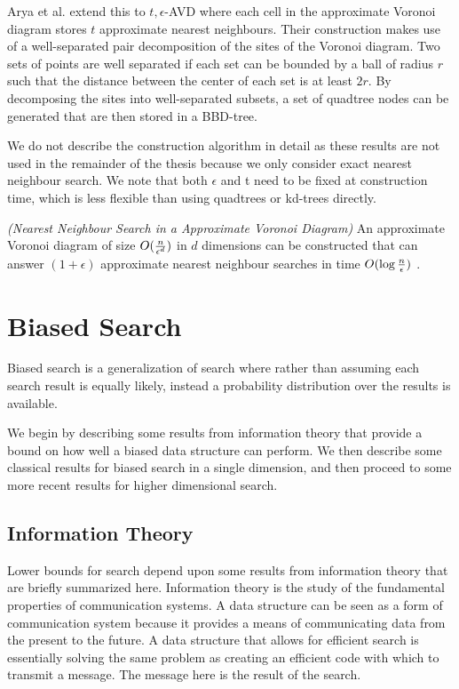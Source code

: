\documentclass[mcs]{scsthesis}
\begin{document}
Arya et al. \cite{arya-avd} extend this to \(t, \epsilon\)-AVD where each
cell in the approximate Voronoi diagram stores \(t\) approximate nearest
neighbours. Their construction makes use of a well-separated pair
decomposition of the sites of the Voronoi diagram. Two sets of points are well
separated if each set can be bounded by a ball of radius \(r\) such that the
distance between the center of each set is at least \(2r\). By decomposing
the sites into well-separated subsets, a set of quadtree nodes can be
generated that are then stored in a BBD-tree. 

We do not describe the construction algorithm in detail as these results are
not used in the remainder of the thesis because we only consider exact
nearest neighbour search. We note that both \(\epsilon\) and t need to be fixed
at construction time, which is less flexible than using quadtrees or kd-trees
directly.

\begin{thm} \emph{(Nearest Neighbour Search in a Approximate Voronoi Diagram)} 
An approximate Voronoi diagram of size \(O({n \over \epsilon ^ d})\) in 
$d$ dimensions can be constructed that can answer \((1 + \epsilon)\)
approximate nearest neighbour searches in time \(O(\log {n \over \epsilon})\)
\cite{arya-avd}.
\end{thm}

\section{Biased Search}

Biased search is a generalization of search where rather than assuming each
search result is equally likely, instead a probability distribution over the
results is available.

We begin by describing some results from information theory that provide a
bound on how well a biased data structure can perform. We then describe some
classical results for biased search in a single dimension, and then proceed
to some more recent results for higher dimensional search.

\subsection{Information Theory}

Lower bounds for search depend upon some results from information theory that
are briefly summarized here. Information theory is the study of the fundamental
properties of communication systems. A data structure can be seen as a form of
communication system because it provides a means of communicating data from the
present to the future. A data structure that allows for efficient search is
essentially solving the same problem as creating an efficient code with which
to transmit a message. The message here is the result of the search.
\end{document}

